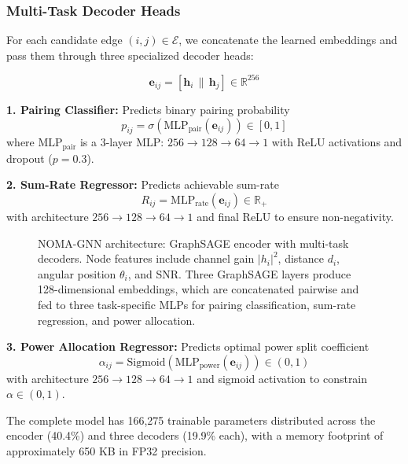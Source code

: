 \documentclass[conference]{IEEEtran}
\begin{document}
\subsubsection{Multi-Task Decoder Heads}

For each candidate edge $(i, j) \in \mathcal{E}$, we concatenate the learned embeddings and pass them through three specialized decoder heads:

\begin{equation}
\mathbf{e}_{ij} = [\mathbf{h}_i \, \| \, \mathbf{h}_j] \in \mathbb{R}^{256}
\end{equation}

\textbf{1. Pairing Classifier:} Predicts binary pairing probability
\begin{equation}
p_{ij} = \sigma\left( \text{MLP}_{\text{pair}}(\mathbf{e}_{ij}) \right) \in [0, 1]
\end{equation}
where $\text{MLP}_{\text{pair}}$ is a 3-layer MLP: $256 \to 128 \to 64 \to 1$ with ReLU activations and dropout ($p=0.3$).

\textbf{2. Sum-Rate Regressor:} Predicts achievable sum-rate
\begin{equation}
R_{ij} = \text{MLP}_{\text{rate}}(\mathbf{e}_{ij}) \in \mathbb{R}_+
\end{equation}
with architecture $256 \to 128 \to 64 \to 1$ and final ReLU to ensure non-negativity.

\begin{figure}[t]
\centering
\resizebox{0.9\textwidth}{!}{}
\caption{NOMA-GNN architecture: GraphSAGE encoder with multi-task decoders. Node features include channel gain $|h_i|^2$, distance $d_i$, angular position $\theta_i$, and SNR. Three GraphSAGE layers produce 128-dimensional embeddings, which are concatenated pairwise and fed to three task-specific MLPs for pairing classification, sum-rate regression, and power allocation.}
\label{fig:gnn_architecture}
\end{figure}

\textbf{3. Power Allocation Regressor:} Predicts optimal power split coefficient
\begin{equation}
\alpha_{ij} = \text{Sigmoid}\left( \text{MLP}_{\text{power}}(\mathbf{e}_{ij}) \right) \in (0, 1)
\end{equation}
with architecture $256 \to 128 \to 64 \to 1$ and sigmoid activation to constrain $\alpha \in (0, 1)$.

The complete model has 166,275 trainable parameters distributed across the encoder (40.4\%) and three decoders (19.9\% each), with a memory footprint of approximately 650 KB in FP32 precision.
\end{document}
